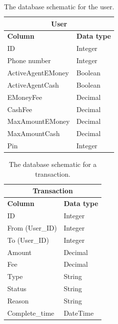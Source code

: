 \documentclass[11pt, a4paper]{article}
\begin{document}
\begin{table}[ht]
\begin{tabular}{ll}
\hline
\multicolumn{2}{|c|}{\textbf{User}}                                                   \\ \hline
\multicolumn{1}{|l|}{\textbf{Column}}                  & \multicolumn{1}{l|}{\textbf{Data type}} \\ \hline
\multicolumn{1}{|l|}{ID}                & \multicolumn{1}{l|}{Integer} \\ \hline
\multicolumn{1}{|l|}{Phone number}      & \multicolumn{1}{l|}{Integer} \\ \hline
\multicolumn{1}{|l|}{ActiveAgentEMoney} & \multicolumn{1}{l|}{Boolean} \\ \hline
\multicolumn{1}{|l|}{ActiveAgentCash}   & \multicolumn{1}{l|}{Boolean} \\ \hline
\multicolumn{1}{|l|}{EMoneyFee}         & \multicolumn{1}{l|}{Decimal} \\ \hline
\multicolumn{1}{|l|}{CashFee}           & \multicolumn{1}{l|}{Decimal} \\ \hline
\multicolumn{1}{|l|}{MaxAmountEMoney}   & \multicolumn{1}{l|}{Decimal} \\ \hline
\multicolumn{1}{|l|}{MaxAmountCash}     & \multicolumn{1}{l|}{Decimal} \\ \hline
\multicolumn{1}{|l|}{Pin}               & \multicolumn{1}{l|}{Integer} \\ \hline
\end{tabular}
\caption{The database schematic for the user.}
\label{tab: user}
\end{table}

\begin{table}[ht]
\begin{tabular}{ll}
\hline
\multicolumn{2}{|c|}{\textbf{Transaction}}                                                   \\ \hline
\multicolumn{1}{|l|}{\textbf{Column}}& \multicolumn{1}{l|}{\textbf{Data type}} \\ \hline
\multicolumn{1}{|l|}{ID}             & \multicolumn{1}{l|}{Integer} \\ \hline
\multicolumn{1}{|l|}{From (User\_ID)} & \multicolumn{1}{l|}{Integer} \\ \hline
\multicolumn{1}{|l|}{To (User\_ID)}   & \multicolumn{1}{l|}{Integer} \\ \hline
\multicolumn{1}{|l|}{Amount}         & \multicolumn{1}{l|}{Decimal} \\ \hline
\multicolumn{1}{|l|}{Fee}            & \multicolumn{1}{l|}{Decimal} \\ \hline
\multicolumn{1}{|l|}{Type}           & \multicolumn{1}{l|}{String} \\ \hline
\multicolumn{1}{|l|}{Status}         & \multicolumn{1}{l|}{String} \\ \hline
\multicolumn{1}{|l|}{Reason}         & \multicolumn{1}{l|}{String} \\ \hline
\multicolumn{1}{|l|}{Complete\_time}  & \multicolumn{1}{l|}{DateTime} \\ \hline
\end{tabular}
\caption{The database schematic for a transaction.}
\label{tab: transaction}
\end{table}
\end{document}
